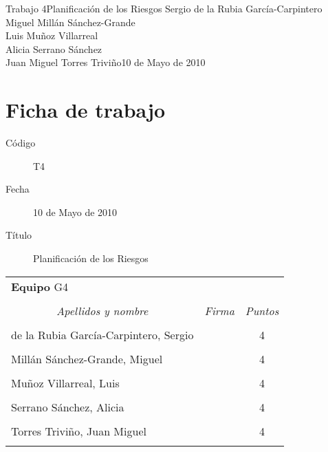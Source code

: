 \documentclass[11pt,a4paper,spanish,twoside]{book}
\begin{document}


{Trabajo 4}{Planificación de los Riesgos}
{Sergio de la Rubia García-Carpintero\\Miguel Millán Sánchez-Grande\\
  Luis Muñoz Villarreal\\Alicia Serrano Sánchez\\
  Juan Miguel Torres Triviño}{10 de Mayo de 2010}


\chapter*{Ficha de trabajo}
\begin{description}
\item[Código] T4
\item[Fecha] 10 de Mayo de 2010
\item[Título] Planificación de los Riesgos
\end{description}

\begin{table}[!ht]
  \centering
  \begin{tabular}{lp{5cm}c}
    \multicolumn{3}{l}{\Large \textbf{Equipo} G4} \\ \\
    \multicolumn{1}{c}{\emph{Apellidos y nombre}} & 
    \multicolumn{1}{c}{\emph{Firma}} & \emph{Puntos} \\
    \hline \\
    de la Rubia García-Carpintero, Sergio & & 4 \\ \\
    Millán Sánchez-Grande, Miguel         & & 4 \\ \\
    Muñoz Villarreal, Luis                & & 4 \\ \\
    Serrano Sánchez, Alicia               & & 4 \\ \\
    Torres Triviño, Juan Miguel           & & 4 \\ \\
    \hline
  \end{tabular}
\end{table}
\end{document}
